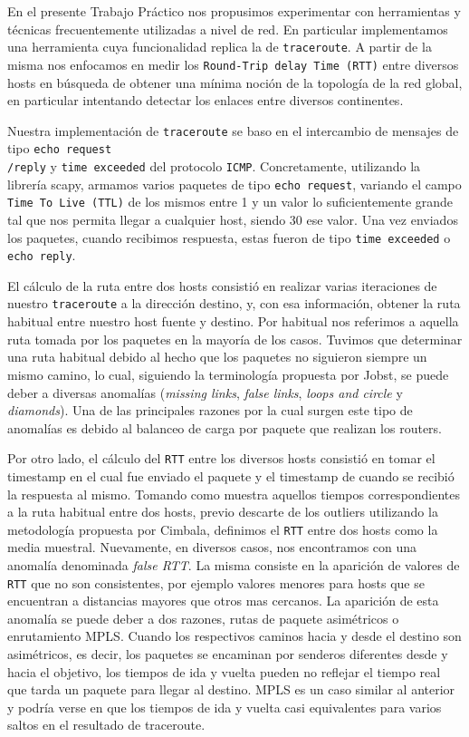 En el presente Trabajo Práctico nos propusimos experimentar con herramientas y técnicas frecuentemente utilizadas a nivel de red. En particular implementamos una herramienta cuya funcionalidad replica la de \texttt{traceroute}. A partir de la misma nos enfocamos en medir los \texttt{Round-Trip delay Time (RTT)} entre diversos hosts en búsqueda de obtener una mínima noción de la topología de la red global, en particular intentando detectar los enlaces entre diversos continentes.

Nuestra implementación de \texttt{traceroute} se baso en el intercambio de mensajes de tipo \texttt{echo request\\/reply} y \texttt{time exceeded} del protocolo \texttt{ICMP}\cite{rfc792}. Concretamente, utilizando la librería scapy, armamos varios paquetes de tipo \texttt{echo request}, variando el campo \texttt{Time To Live (TTL)} de los mismos entre 1 y un valor lo suficientemente grande tal que nos permita llegar a cualquier host, siendo 30 ese valor. Una vez enviados los paquetes, cuando recibimos respuesta, estas fueron de tipo \texttt{time exceeded} o \texttt{echo reply}.

El cálculo de la ruta entre dos hosts consistió en realizar varias iteraciones de nuestro \texttt{traceroute} a la dirección destino, y, con esa información, obtener la ruta habitual entre nuestro host fuente y destino. Por habitual nos referimos a aquella ruta tomada por los paquetes en la mayoría de los casos. Tuvimos que determinar una ruta habitual debido al hecho que los paquetes no siguieron siempre un mismo camino, lo cual, siguiendo la terminología propuesta por Jobst\cite{Jobst}, se puede deber a diversas anomalías (\textit{missing links}, \textit{false links}, \textit{loops and circle} y \textit{diamonds}).
Una de las principales razones por la cual surgen este tipo de anomalías es debido al balanceo de carga por paquete que realizan los routers.

Por otro lado, el cálculo del \texttt{RTT} entre los diversos hosts consistió en tomar el timestamp en el cual fue enviado el paquete y el timestamp de cuando se recibió la respuesta al mismo. Tomando como muestra aquellos tiempos correspondientes a la ruta habitual entre dos hosts, previo descarte de los outliers utilizando la metodología propuesta por Cimbala\cite{Cimbala}, definimos el \texttt{RTT} entre dos hosts como la media muestral. Nuevamente, en diversos casos, nos encontramos con una anomalía denominada \textit{false RTT}. La misma consiste en la aparición de valores de \texttt{RTT} que no son consistentes, por ejemplo valores menores para hosts que se encuentran a distancias mayores que otros mas cercanos. La aparición de esta anomalía se puede deber a dos razones, rutas de paquete asimétricos o enrutamiento MPLS. Cuando los respectivos caminos hacia y desde el destino son asimétricos, es decir, los paquetes se encaminan por senderos diferentes desde y hacia el objetivo, los tiempos de ida y vuelta pueden no reflejar el tiempo real que tarda un paquete para llegar al destino. MPLS es un caso similar al anterior y podría verse en que los tiempos de ida y vuelta casi equivalentes para varios saltos en el resultado de traceroute.

